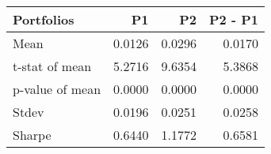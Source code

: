 \begin{tabular}{lrrr}
\toprule
Portfolios & P1 & P2 & P2 - P1 \\
\midrule
Mean & 0.0126 & 0.0296 & 0.0170 \\
t-stat of mean & 5.2716 & 9.6354 & 5.3868 \\
p-value of mean & 0.0000 & 0.0000 & 0.0000 \\
Stdev & 0.0196 & 0.0251 & 0.0258 \\
Sharpe & 0.6440 & 1.1772 & 0.6581 \\
\bottomrule
\end{tabular}
